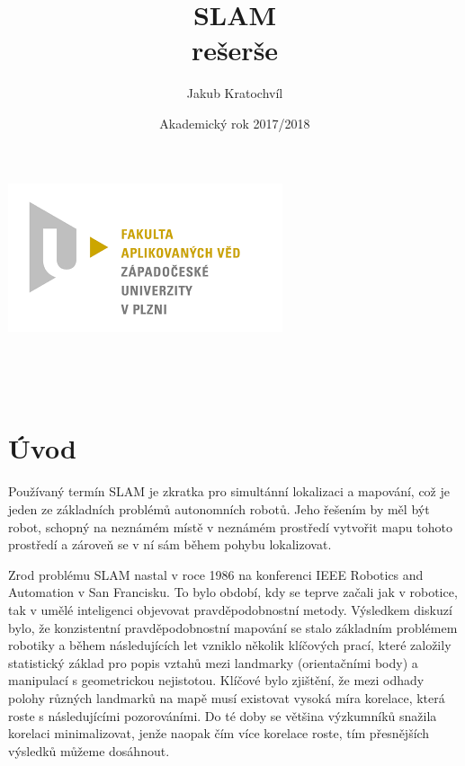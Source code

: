 \documentclass[12pt,a4paper]{article}
\begin{document}
\title{SLAM\\rešerše}
\author{Jakub Kratochvíl}
\date{Akademický rok 2017/2018}
\begin{titlepage}
\begin{center}
\includegraphics[scale=0.5]{logo_zcu}\\
\vspace{5cm}
\begin{Large}
\textbf{\thetitle}\\
\end{Large}
\vspace{3cm}
\theauthor\\
\vspace{5cm}
\thedate
\end{center}
\end{titlepage}
\newpage
		
		
\tableofcontents
\newpage
\fontsize{12pt}{18pt}\selectfont


\section{Úvod}
Používaný termín SLAM je zkratka pro simultánní lokalizaci a mapování, což je jeden ze základních problémů autonomních robotů. Jeho řešením by měl být robot, schopný na neznámém místě v neznámém prostředí vytvořit mapu tohoto prostředí a zároveň se v ní sám během pohybu lokalizovat.

Zrod problému SLAM nastal v roce 1986 na konferenci IEEE Robotics and Automation v San Francisku. To bylo období, kdy se teprve začali jak v robotice, tak v umělé inteligenci objevovat pravděpodobnostní metody. Výsledkem diskuzí bylo, že konzistentní pravděpodobnostní mapování se stalo základním problémem robotiky a během následujících let vzniklo několik klíčových prací, které založily statistický základ pro popis vztahů mezi landmarky (orientačními body) a manipulací s geometrickou nejistotou. Klíčové bylo zjištění, že mezi odhady polohy různých landmarků na mapě musí existovat vysoká míra korelace, která roste s následujícími pozorováními. Do té doby se většina výzkumníků snažila korelaci minimalizovat, jenže naopak čím více korelace roste, tím přesnějších výsledků můžeme dosáhnout.
\end{document}
